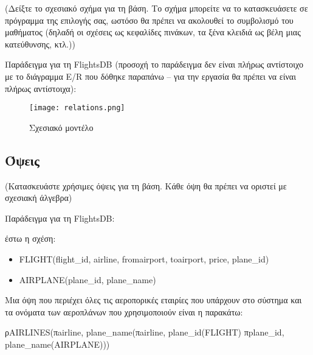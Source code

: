 (Δείξτε το σχεσιακό σχήμα για τη βάση. Το σχήμα μπορείτε να το
κατασκευάσετε σε πρόγραμμα της επιλογής σας, ωστόσο θα πρέπει να
ακολουθεί το συμβολισμό του μαθήματος (δηλαδή οι σχέσεις ως κεφαλίδες
πινάκων, τα ξένα κλειδιά ως βέλη μιας κατεύθυνσης, κτλ.))

Παράδειγμα για τη FlightsDB (προσοχή το παράδειγμα δεν είναι πλήρως
αντίστοιχο με το διάγραμμα E/R που δόθηκε παραπάνω – για την εργασία
θα πρέπει να είναι πλήρως αντίστοιχα):

\begin{figure}[H]
  \centering
  \texttt{[image: relations.png]}
  \caption{Σχεσιακό μοντέλο}
\end{figure}

\subsection{Όψεις}
(Κατασκευάστε χρήσιμες όψεις για τη βάση. Κάθε όψη θα πρέπει να
οριστεί με σχεσιακή άλγεβρα)

Παράδειγμα για τη FlightsDB:

έστω η σχέση:

\begin{itemize}[noitemsep]
\item FLIGHT(flight\_id, airline, fromairport, toairport, price,
  plane\_id)
\item AIRPLANE(plane\_id, plane\_name) 
\end{itemize}

Μια όψη που περιέχει όλες τις αεροπορικές εταιρίες που υπάρχουν στο
σύστημα και τα ονόματα των αεροπλάνων που χρησιμοποιούν είναι η
παρακάτω:

ρAIRLINES(πairline, plane\_name(πairline, plane\_id(FLIGHT)
πplane\_id, plane\_name(AIRPLANE)))



